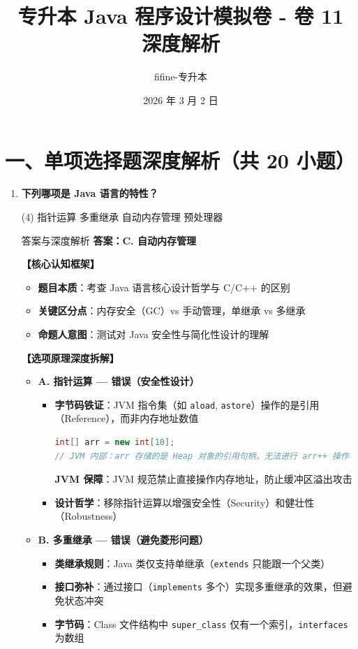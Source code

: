 \documentclass[12pt, a4paper]{ctexart}
\title{\textcolor{myblue}{\textbf{专升本 Java 程序设计模拟卷 - 卷 11 深度解析}}}
\author{fifine-专升本}
\date{2026 年 3 月 2 日}
\newcommand{\code}[1]{\texttt{#1}}
\begin{document}
\maketitle
\thispagestyle{empty}
\newpage

\section*{一、单项选择题深度解析（共 20 小题）}

\begin{enumerate}[label=\textbf{\arabic*.}, leftmargin=*, itemsep=1.5em]
\item \textbf{下列哪项是 Java 语言的特性？}
\begin{tasks}(4)
    \task 指针运算 \task 多重继承 \task 自动内存管理 \task 预处理器
\end{tasks}
\begin{bluebox}{答案与深度解析}
\textbf{答案：C. 自动内存管理}

\textbf{【核心认知框架】}
\begin{itemize}[leftmargin=*, nosep]
    \item \textbf{题目本质}：考查 Java 语言核心设计哲学与 C/C++ 的区别
    \item \textbf{关键区分点}：内存安全（GC）vs 手动管理，单继承 vs 多继承
    \item \textbf{命题人意图}：测试对 Java 安全性与简化性设计的理解
\end{itemize}

\textbf{【选项原理深度拆解】}
\begin{itemize}[leftmargin=*, nosep]
    \item \textbf{A. 指针运算 — 错误（安全性设计）}
    \begin{itemize}[leftmargin=*, nosep]
        \item \textbf{字节码铁证}：JVM 指令集（如 \code{aload}, \code{astore}）操作的是引用（Reference），而非内存地址数值
        \begin{lstlisting}[language=Java]
int[] arr = new int[10];
// JVM 内部：arr 存储的是 Heap 对象的引用句柄，无法进行 arr++ 操作
        \end{lstlisting}
        \textbf{JVM 保障}：JVM 规范禁止直接操作内存地址，防止缓冲区溢出攻击
        \item \textbf{设计哲学}：移除指针运算以增强安全性（Security）和健壮性（Robustness）
    \end{itemize}
    
    \item \textbf{B. 多重继承 — 错误（避免菱形问题）}
    \begin{itemize}[leftmargin=*, nosep]
        \item \textbf{类继承规则}：Java 类仅支持单继承（\code{extends} 只能跟一个父类）
        \item \textbf{接口弥补}：通过接口（\code{implements} 多个）实现多重继承的效果，但避免状态冲突
        \item \textbf{字节码}：Class 文件结构中 \code{super\_class} 仅有一个索引，\code{interfaces} 为数组
    \end{itemize}
    

\end{itemize}
\end{bluebox}
\end{enumerate}
\end{document}
